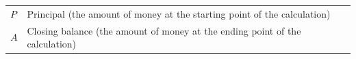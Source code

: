 \begin{itemize}[noitemsep]
{{    \addtocounter{footnote}{-0}
    
          }{ %
        
    
        \begin{center}
      
      \label{m39335*id75382}
      
    \noindent
      \tablelasttail{}
      \begin{xtabular}[t]{|l|l|}\hline
    
    
        
                  \begin{math}P\end{math}
                 &
    
    
        Principal (the amount of money at the starting point of the calculation)%
     \tabularnewline{}
    
    
        
                  \begin{math}A\end{math}
                 &
    
    
        Closing balance (the amount of money at the ending point of the calculation)%
     \tabularnewline{}
    

\end{xtabular}
\end{center}}}
\end{itemize}
